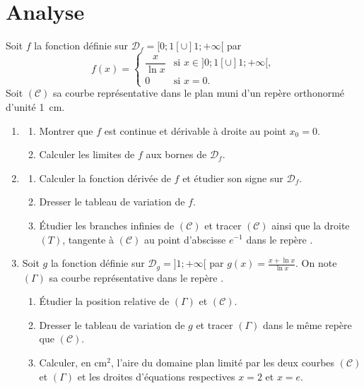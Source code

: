 \section{Analyse}
\begin{exo}
\label{exo:pb x sur ln}
Soit $f$ la fonction d\'efinie sur
$\mathcal{D}_f = [0 ; 1[ \cup ]1 ; +\infty[$ par
\[
  f(x)=
  \begin{cases}
    \dfrac{x}{\ln x} & \text{si } x \in ]0 ; 1[ \cup ]1 ; +\infty[, \\
    0                 & \text{si } x=0.
  \end{cases}
\]
Soit $(\mathscr{C})$ sa courbe repr\'esentative dans le plan muni d'un rep\`ere
orthonorm\'e \Oij{} d'unit\'e 1~cm.
\begin{enumerate}
\item \begin{enumerate}
      \item Montrer que $f$ est continue et d\'erivable \`a droite au point $x_0 = 0$.
      \item Calculer les limites de $f$ aux bornes de $\mathcal{D}_f$.
      \end{enumerate}
\item \begin{enumerate}
      \item Calculer la fonction d\'eriv\'ee de $f$ et \'etudier son signe sur $\mathcal{D}_f$.
	      \item Dresser le tableau de variation de $f$.
	      \item \'Etudier les branches infinies de $(\mathscr{C})$ et tracer $(\mathscr{C})$ ainsi que
            la droite $(T)$, tangente \`a $(\mathscr{C})$ au point d'abscisse $e^{-1}$ dans le rep\`ere \Oij.
      \end{enumerate}
\item Soit $g$ la fonction d\'efinie sur $\mathcal{D}_g = ]1 ; +\infty[$ par
      $g(x) = \frac{x + \ln x}{\ln x}$.
      On note $(\Gamma)$ sa courbe repr\'esentative dans le rep\`ere \Oij.
      \begin{enumerate}
      \item \'Etudier la position relative de $(\Gamma)$ et $(\mathscr{C})$.
      \item Dresser le tableau de variation de $g$ et tracer $(\Gamma)$ dans le m\^eme rep\`ere que $(\mathscr{C})$.
      \item Calculer, en $\text{cm}^2$, l'aire du domaine plan limit\'e par les deux courbes $(\mathscr{C})$ et $(\Gamma)$
            et les droites d'\'equations respectives $x = 2$ et $x = e$.
      \end{enumerate}
\end{enumerate}
\end{exo}
